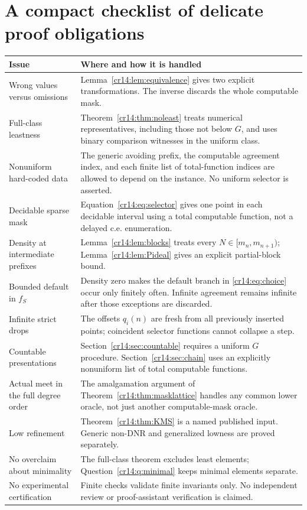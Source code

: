 \documentclass[11pt,a4paper]{article}
\theoremstyle{definition}
\theoremstyle{remark}
\begin{document}
\section{A compact checklist of delicate proof obligations}
\label{cr14:app:checklist}
\begin{longtable}{@{}>{\raggedright\arraybackslash}p{}p{}@{}}
\toprule
Issue & Where and how it is handled\\
\midrule
\endhead
Wrong values versus omissions & Lemma~\ref{cr14:lem:equivalence} gives two
explicit transformations. The inverse discards the whole computable mask.\\[4pt]
Full-class leastness & Theorem~\ref{cr14:thm:noleast} treats numerical
representatives, including those not below $G$, and uses binary comparison
witnesses in the uniform class.\\[4pt]
Nonuniform hard-coded data & The generic avoiding prefix, the computable
agreement index, and each finite list of total-function indices are
allowed to depend on the instance. No uniform selector is asserted.\\[4pt]
Decidable sparse mask & Equation~\eqref{cr14:eq:selector} gives one point in
each decidable interval using a total computable function, not a delayed
c.e. enumeration.\\[4pt]
Density at intermediate prefixes & Lemma~\ref{cr14:lem:blocks} treats every
$N\in[m_n,m_{n+1})$; Lemma~\ref{cr14:lem:Pideal} gives an explicit partial-block
bound.\\[4pt]
Bounded default in $f_S$ & Density zero makes the default branch in
\eqref{cr14:eq:choice} occur only finitely often. Infinite agreement remains
infinite after those exceptions are discarded.\\[4pt]
Infinite strict drops & The offsets $q_i(n)$ are fresh from all previously
inserted points; coincident selector functions cannot collapse a step.\\[4pt]
Countable presentations & Section~\ref{cr14:sec:countable} requires a uniform
$G$ procedure. Section~\ref{cr14:sec:chain} uses an explicitly nonuniform list
of total computable functions.\\[4pt]
Actual meet in the full degree order & The amalgamation argument of
Theorem~\ref{cr14:thm:masklattice} handles any common lower oracle, not just
another computable-mask oracle.\\[4pt]
Low refinement & Theorem~\ref{cr14:thm:KMS} is a named published input.
Generic non-DNR and generalized lowness are proved separately.\\[4pt]
No overclaim about minimality & The full-class theorem excludes least
elements; Question~\ref{cr14:q:minimal} keeps minimal elements separate.\\[4pt]
No experimental certification & Finite checks validate finite invariants
only. No independent review or proof-assistant verification is claimed.\\
\bottomrule
\end{longtable}
\end{document}
